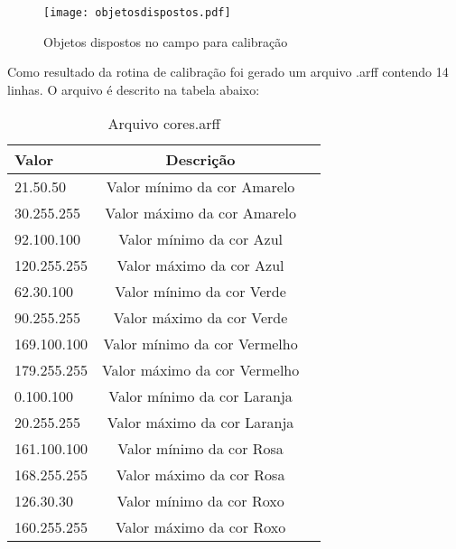 	\begin{figure}[H]
\centering
\texttt{[image: objetosdispostos.pdf]}
\caption{Objetos dispostos no campo para calibração}
\label{fig:objetodispostos}
\end{figure}	
	
Como resultado da rotina de calibraç\~{a}o foi gerado um arquivo .arff contendo 14 linhas. O arquivo é descrito na tabela abaixo:
	\begin{table}[H]
\centering 
\begin{tabular}{l|c|c}
\\ Valor & Descrição  \\%
\hline                               %
21.50.50  &   Valor mínimo da cor Amarelo \\ \hline  
30.255.255  &  Valor máximo da cor Amarelo \\  \hline 
92.100.100  &   Valor mínimo da cor Azul \\  \hline 
120.255.255  &  Valor máximo da cor  Azul \\  \hline 
62.30.100 &  Valor mínimo da cor Verde \\  \hline 
90.255.255  &  Valor máximo da cor Verde \\  \hline 
169.100.100  &  Valor mínimo da cor Vermelho \\  \hline 
179.255.255  &  Valor máximo da cor Vermelho \\   \hline 
0.100.100  &  Valor mínimo da cor Laranja \\  \hline 
20.255.255 &  Valor máximo da cor  Laranja \\  \hline 
161.100.100 &  Valor mínimo da cor Rosa \\  \hline 
168.255.255 &   Valor máximo da cor Rosa \\  \hline 
126.30.30 &  Valor mínimo da cor Roxo \\  \hline 
160.255.255 &  Valor máximo da cor Roxo \\  \hline 
\end{tabular}
\caption{Arquivo cores.arff}
\end{table}





